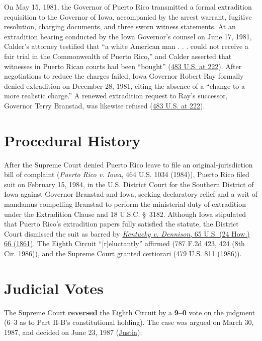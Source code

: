 \documentclass[12pt]{article}
\begin{document}
On May 15, 1981, the Governor of Puerto Rico transmitted a formal extradition requisition to the Governor of Iowa, accompanied by the arrest warrant, fugitive resolution, charging documents, and three sworn witness statements. At an extradition hearing conducted by the Iowa Governor's counsel on June 17, 1981, Calder's attorney testified that ``a white American man . . . could not receive a fair trial in the Commonwealth of Puerto Rico,'' and Calder asserted that witnesses in Puerto Rican courts had been ``bought'' (\href{https://supreme.justia.com/cases/federal/us/483/219/}{483 U.S. at 222}). After negotiations to reduce the charges failed, Iowa Governor Robert Ray formally denied extradition on December 28, 1981, citing the absence of a ``change to a more realistic charge.'' A renewed extradition request to Ray's successor, Governor Terry Branstad, was likewise refused (\href{https://supreme.justia.com/cases/federal/us/483/219/}{483 U.S. at 222}).

\section{Procedural History}
After the Supreme Court denied Puerto Rico leave to file an original-jurisdiction bill of complaint (\emph{Puerto Rico v. Iowa}, 464 U.S. 1034 (1984)), Puerto Rico filed suit on February 15, 1984, in the U.S. District Court for the Southern District of Iowa against Governor Branstad and Iowa, seeking declaratory relief and a writ of mandamus compelling Branstad to perform the ministerial duty of extradition under the Extradition Clause and 18 U.S.C. \S~3182. Although Iowa stipulated that Puerto Rico's extradition papers fully satisfied the statute, the District Court dismissed the suit as barred by \href{https://supreme.justia.com/cases/federal/us/65/66/}{\emph{Kentucky v. Dennison}, 65 U.S. (24 How.) 66 (1861)}. The Eighth Circuit ``[r]eluctantly'' affirmed (787 F.2d 423, 424 (8th Cir. 1986)), and the Supreme Court granted certiorari (479 U.S. 811 (1986)).

\section{Judicial Votes}
The Supreme Court \textbf{reversed} the Eighth Circuit by a \textbf{9--0} vote on the judgment (6--3 as to Part II-B's constitutional holding). The case was argued on March 30, 1987, and decided on June 23, 1987 (\href{https://supreme.justia.com/cases/federal/us/483/219/}{Justia}):
\end{document}
